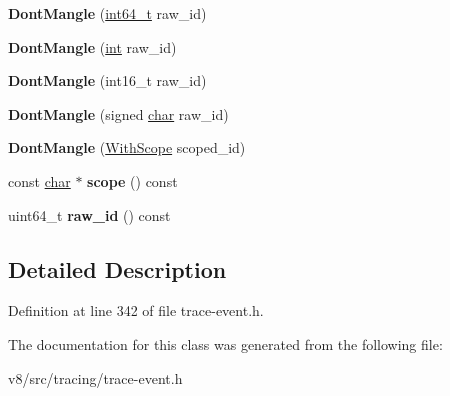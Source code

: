 \begin{DoxyCompactItemize}
{\bfseries Dont\+Mangle} (\mbox{\hyperlink{classint64__t}{int64\+\_\+t}} raw\+\_\+id)
\item 
\mbox{\label{classv8_1_1internal_1_1tracing_1_1TraceID_1_1DontMangle_a08700d6842ccae690f22f42f067dd2d3}} 
{\bfseries Dont\+Mangle} (\mbox{\hyperlink{classint}{int}} raw\+\_\+id)
\item 
\mbox{\label{classv8_1_1internal_1_1tracing_1_1TraceID_1_1DontMangle_a8b0e6cc46f03f8de6dcf67057a88f377}} 
{\bfseries Dont\+Mangle} (int16\+\_\+t raw\+\_\+id)
\item 
\mbox{\label{classv8_1_1internal_1_1tracing_1_1TraceID_1_1DontMangle_a2ed02b5d1076c2e470bf1d43826695c6}} 
{\bfseries Dont\+Mangle} (signed \mbox{\hyperlink{classchar}{char}} raw\+\_\+id)
\item 
\mbox{\label{classv8_1_1internal_1_1tracing_1_1TraceID_1_1DontMangle_a13bc1d06b3a9260d0c0d258ade0ec812}} 
{\bfseries Dont\+Mangle} (\mbox{\hyperlink{classv8_1_1internal_1_1tracing_1_1TraceID_1_1WithScope}{With\+Scope}} scoped\+\_\+id)
\item 
\mbox{\label{classv8_1_1internal_1_1tracing_1_1TraceID_1_1DontMangle_a4d75d3c1976f626b675dd105e381893b}} 
const \mbox{\hyperlink{classchar}{char}} $\ast$ {\bfseries scope} () const
\item 
\mbox{\label{classv8_1_1internal_1_1tracing_1_1TraceID_1_1DontMangle_ab6f29fe6e246d85da939b0239cdef01e}} 
uint64\+\_\+t {\bfseries raw\+\_\+id} () const
\end{DoxyCompactItemize}


\subsection{Detailed Description}


Definition at line 342 of file trace-\/event.\+h.



The documentation for this class was generated from the following file\+:\begin{DoxyCompactItemize}
\item 
v8/src/tracing/trace-\/event.\+h\end{DoxyCompactItemize}
